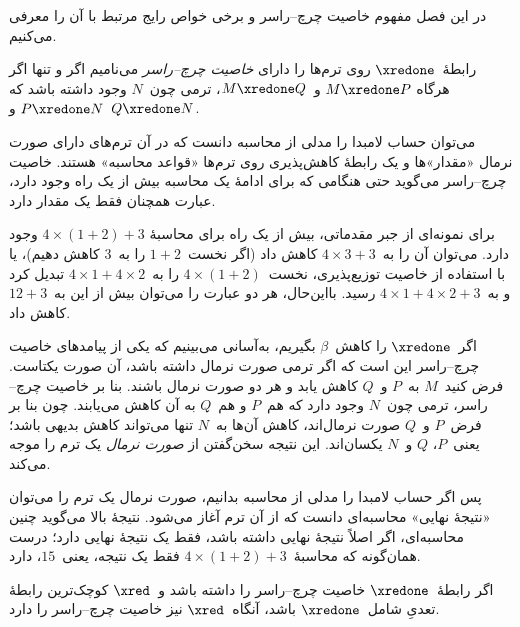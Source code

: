 \documentclass[../../../include/open-logic-section]{subfiles}
\begin{document}


در این فصل مفهوم خاصیت چرچ--راسر و برخی خواص رایج مرتبط با آن را
معرفی می‌کنیم.

\begin{defn} رابطهٔ~$\xredone$ روی ترم‌ها را
  دارای \emph{خاصیت چرچ--راسر} می‌نامیم اگر و تنها اگر هرگاه
  $M \xredone P$ و~$M \xredone Q$، ترمی چون~$N$ وجود داشته باشد که
  $P \xredone N$ و~$Q \xredone N$.
\end{defn}

می‌توان حساب لامبدا را مدلی از محاسبه دانست که در آن ترم‌های دارای
صورت نرمال «مقدار»ها و یک رابطهٔ کاهش‌پذیری روی ترم‌ها «قواعد محاسبه»
هستند. خاصیت چرچ--راسر می‌گوید حتی هنگامی که برای ادامهٔ یک محاسبه بیش
از یک راه وجود دارد، عبارت همچنان فقط یک مقدار دارد.

برای نمونه‌ای از جبر مقدماتی، بیش از یک راه برای محاسبهٔ
$4 \times (1+2) + 3$ وجود دارد. می‌توان آن را به~$4 \times 3+3$ کاهش
داد (اگر نخست~$1+2$ را به~$3$ کاهش دهیم)، یا با استفاده از خاصیت
توزیع‌پذیری، نخست~$4 \times (1+2)$ را به~$4 \times 1+4 \times 2$
تبدیل کرد و به~$4 \times 1+4 \times 2+3$ رسید. بااین‌حال، هر دو عبارت
را می‌توان بیش از این به~$12+3$ کاهش داد.

اگر~$\xredone$ را کاهش~$\beta$ بگیریم، به‌آسانی می‌بینیم که یکی از
پیامدهای خاصیت چرچ--راسر این است که اگر ترمی صورت نرمال داشته باشد، آن
صورت یکتاست. فرض کنید~$M$ به~$P$ و~$Q$ کاهش یابد و هر دو صورت نرمال
باشند. بنا بر خاصیت چرچ--راسر، ترمی چون~$N$ وجود دارد که هم~$P$ و
هم~$Q$ به آن کاهش می‌یابند. چون بنا بر فرض~$P$ و~$Q$ صورت نرمال‌اند،
کاهش آن‌ها به~$N$ تنها می‌تواند کاهش بدیهی باشد؛ یعنی~$P$، $Q$ و~$N$
یکسان‌اند. این نتیجه سخن‌گفتن از \emph{صورت نرمال} یک ترم را موجه
می‌کند.

پس اگر حساب لامبدا را مدلی از محاسبه بدانیم، صورت نرمال یک ترم را
می‌توان «نتیجهٔ نهایی» محاسبه‌ای دانست که از آن ترم آغاز می‌شود. نتیجهٔ
بالا می‌گوید چنین محاسبه‌ای، اگر اصلاً نتیجهٔ نهایی داشته باشد، فقط یک
نتیجهٔ نهایی دارد؛ درست همان‌گونه که محاسبهٔ~$4 \times (1+2)+3$ فقط یک
نتیجه، یعنی~$15$، دارد.

\begin{thm} 
  اگر رابطهٔ~$\xredone$ خاصیت چرچ--راسر را داشته باشد و~$\xred$ کوچک‌ترین
  رابطهٔ تعدیِ شامل~$\xredone$ باشد، آنگاه~$\xred$ نیز خاصیت چرچ--راسر
  را دارد.
\end{thm}
\end{document}
